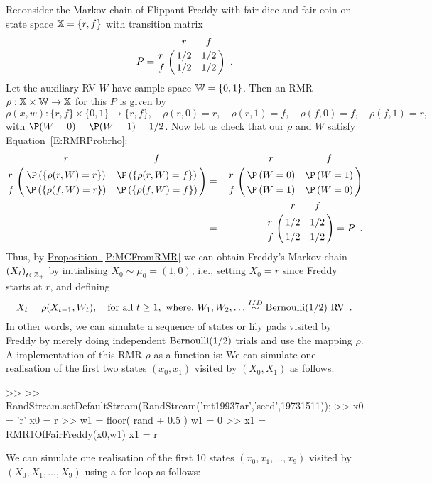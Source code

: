 \begin{example}\label{EX:RMRFreddy}
Reconsider the Markov chain of Flippant Freddy with fair dice and fair coin on state space $\mathbb{X}=\{r,f\}$ with transition matrix 
$$P=\bordermatrix{~ & r & f \cr
r & 1/2 & 1/2\cr
f & 1/2 &1/2}\enspace .$$
Let the auxiliary RV $W$ have sample space $\mathbb{W}=\{0,1\}$.  Then an RMR $\rho: \mathbb{X} \times \mathbb{W} \to \mathbb{X}$ for this $P$ is given by 
\[
\rho (x,w) : \{r,f\} \times \{0,1\} \to \{r,f\},
\quad \rho(r,0)=r, \quad \rho(r,1)=f, \quad \rho(f,0)=f,  \quad \rho(f,1)=r ,
\]
with $\P(W=0)=\P(W=1)=1/2$.  Now let us check that our $\rho$ and $W$ satisfy \hyperref[E:RMRProbrho]{Equation~\ref*{E:RMRProbrho}}:
\begin{eqnarray*}
\bordermatrix{~ & r & f \cr
r & \P \left( \{ \rho (r,W) = r \} \right) & \P \left( \{ \rho (r,W) = f \} \right) \cr
f & \P \left( \{ \rho (f,W) = r \} \right) & \P \left( \{ \rho (f,W) = f \} \right) }
&=&
\bordermatrix{~ & r & f \cr
r & \P \left( W=0 \right) & \P \left( W=1 \right) \cr
f & \P \left( W=1 \right) & \P \left( W=0 \right)} \\
&=&
\bordermatrix{~ & r & f \cr
r & 1/2 & 1/2\cr
f & 1/2 &1/2}
=
P \enspace .
\end{eqnarray*}
Thus, by \hyperref[P:MCFromRMR]{Proposition~\ref*{P:MCFromRMR}} we can obtain Freddy's Markov chain $\left(X_t\right)_{t\in \mathbb{Z}_+}$ by initialising $X_0 \sim \mu_0=(1,0)$, i.e., setting $X_0=r$ since Freddy starts at $r$, and defining
\[
X_t = \rho(X_{t-1},W_t), \quad \text{for all } t \geq 1, \text{ where, } W_1,W_2,\ldots \overset{IID}{\sim} \mbox{{\rm Bernoulli}}(1/2) \text{ RV} \enspace .
\]
In other words, we can simulate a sequence of states or lily pads visited by Freddy by merely doing independent $\mbox{{\rm Bernoulli}}(1/2)$ trials and use the mapping $\rho$.  A \Matlab implementation of this RMR $\rho$ as a \Matlab function is:
We can simulate one realisation of the first two states $(x_0,x_1)$ visited by $(X_0,X_1)$ as follows:
\begin{VrbM}
>> %
>> RandStream.setDefaultStream(RandStream('mt19937ar','seed',19731511));
>> x0 = 'r' %
x0 = r
>> w1 = floor( rand + 0.5 ) %
w1 =     0
>> x1 = RMR1OfFairFreddy(x0,w1) %
x1 = r
\end{VrbM}
We can simulate one realisation of the first 10 states $(x_0,x_1,\ldots,x_9)$ visited by $(X_0,X_1,\ldots, X_9)$ using a for loop as follows:

\end{example}
